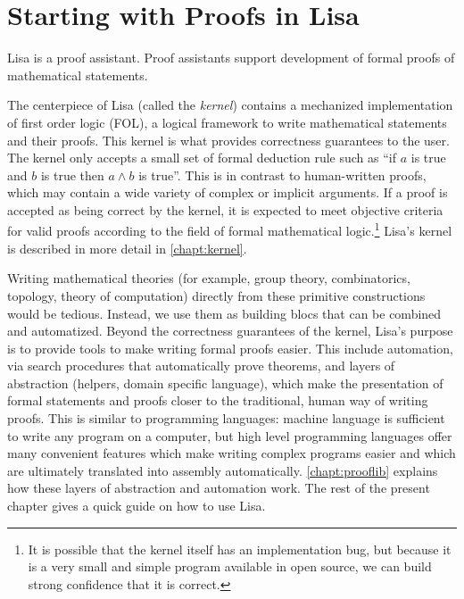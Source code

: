 \chapter{Starting with Proofs in Lisa}
\label{chapt:quickguide}
Lisa is a proof assistant. Proof assistants support development of formal proofs of mathematical statements.

The centerpiece of Lisa (called the \emph{kernel}) contains a mechanized implementation of first order logic (FOL), a logical framework to write mathematical statements and their proofs. This kernel is what provides correctness guarantees to the user. The kernel only accepts a small set of formal deduction rule such as ``if $a$ is true and $b$ is true then $a\land b$ is true''.
This is in contrast to human-written proofs, which may contain a wide variety of complex or implicit arguments. If a proof is accepted as being correct by the kernel, it is expected to meet objective criteria for valid proofs according to the field of formal mathematical logic.\footnote{It is possible that the kernel itself has an implementation bug, but because it is a very small and simple program available in open source, we can build strong confidence that it is correct.}
Lisa's kernel is described in more detail in \autoref{chapt:kernel}.

Writing mathematical theories (for example, group theory, combinatorics, topology, theory of computation) directly from these primitive constructions would be tedious. Instead, we use them as building blocs that can be combined and automatized. Beyond the correctness guarantees of the kernel, Lisa's purpose is to provide tools to make writing formal proofs easier. This include automation, via search procedures that automatically prove theorems, and layers of abstraction (helpers, domain specific language), which make the presentation of formal statements and proofs closer to the traditional, human way of writing proofs.
This is similar to programming languages: machine language is sufficient to write any program on a computer, but high level programming languages offer many convenient features which make writing complex programs easier and which are ultimately translated into assembly automatically.
\autoref{chapt:prooflib} explains how these layers of abstraction and automation work. The rest of the present chapter gives a quick guide on how to use Lisa.

